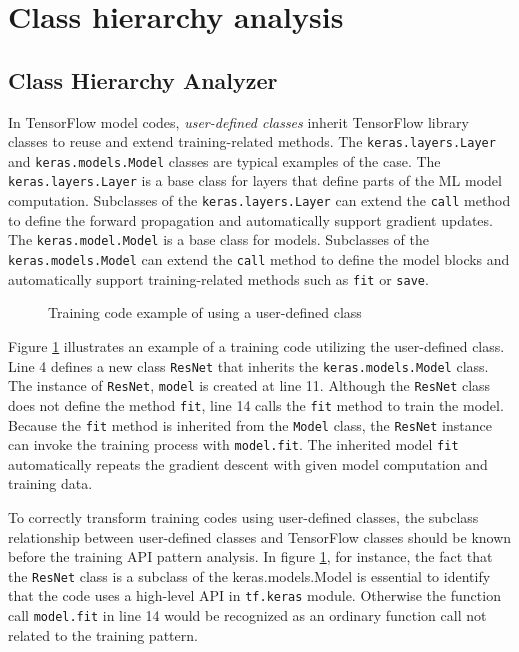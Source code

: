 \section{Class hierarchy analysis}\label{sec:cha}

\subsection{Class Hierarchy Analyzer}

In TensorFlow model codes, \textit{user-defined classes} inherit
TensorFlow library classes to reuse and extend training-related methods.
The {\tt keras.layers.Layer} and {\tt keras.models.Model} classes 
are typical examples of the case.
The {\tt keras.layers.Layer} is a base class for
layers that define parts of the ML model computation.
Subclasses of the {\tt keras.layers.Layer} can extend
the {\tt call} method to define the forward propagation
and automatically support gradient updates.
The {\tt keras.model.Model} is a base class for models.
Subclasses of the {\tt keras.models.Model} can extend
the {\tt call} method to define the model blocks
and automatically support training-related methods
such as {\tt fit} or {\tt save}. 

\begin{figure}[h]

\caption{Training code example of using a user-defined class}
\label{fig:cha:ex}
\end{figure}

Figure \ref{fig:cha:ex} illustrates an example of a training code
utilizing the user-defined class. 
Line 4 defines a new class {\tt ResNet} that inherits the  
{\tt keras.models.Model} class. The instance of {\tt ResNet}, {\tt model}
is created at line 11. Although the {\tt ResNet} class does not define
the method {\tt fit}, line 14 calls the {\tt fit} method to train the model.
Because the {\tt fit} method is inherited from the {\tt Model} class,
the {\tt ResNet} instance can invoke the training process with
{\tt model.fit}. The inherited model {\tt fit}
automatically repeats the gradient descent with
given model computation and training data. 

To correctly transform training codes using user-defined classes,
the subclass relationship between user-defined classes
and TensorFlow classes should be known before the training API pattern analysis. 
In figure \ref{fig:cha:ex}, for instance, 
the fact that the {\tt ResNet} class
is a subclass of the {keras.models.Model} is essential to identify
that the code uses a high-level API in {\tt tf.keras} module. 
Otherwise the function call {\tt model.fit} in line 14 would
be recognized as an ordinary function call not related to the training pattern.

